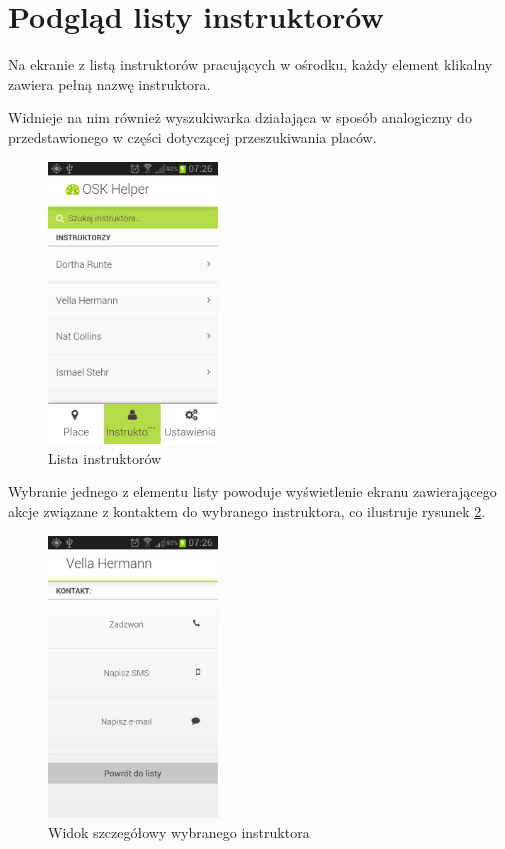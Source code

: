 \documentclass[twoside,a4paper,openright,12pt]{book}
\begin{document}
\section{Podgląd listy instruktorów}

Na ekranie z listą instruktorów pracujących w ośrodku, każdy element klikalny zawiera pełną nazwę instruktora.

Widnieje na nim również wyszukiwarka działająca w sposób analogiczny do przedstawionego w części dotyczącej przeszukiwania placów.

\begin{figure}[H]
\centering
\includegraphics[width=0.4\textwidth]{screenshots/android/lista_instruktorow.png}
\caption{Lista instruktorów}
\label{fig:Lista_instruktorow_mobile}
\end{figure}

Wybranie jednego z elementu listy powoduje wyświetlenie ekranu zawierającego akcje związane z kontaktem do wybranego instruktora, co ilustruje rysunek \ref{fig:Instruktor_mobile}.

\begin{figure}[H]
\centering
\includegraphics[width=0.4\textwidth]{screenshots/android/widok_szczegolowy_instruktora.png}
\caption{Widok szczegółowy wybranego instruktora}
\label{fig:Instruktor_mobile}
\end{figure}
\end{document}
